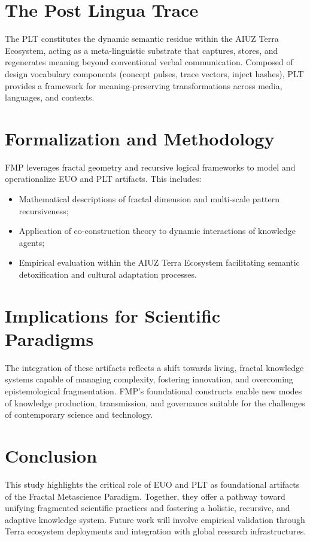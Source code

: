 \documentclass[12pt,a4paper]{article}
\begin{document}
\section{The Post Lingua Trace}
The PLT constitutes the dynamic semantic residue within the AIUZ Terra Ecosystem, acting as a meta-linguistic substrate that captures, stores, and regenerates meaning beyond conventional verbal communication. Composed of design vocabulary components (concept pulses, trace vectors, inject hashes), PLT provides a framework for meaning-preserving transformations across media, languages, and contexts.

\section{Formalization and Methodology}
FMP leverages fractal geometry and recursive logical frameworks to model and operationalize EUO and PLT artifacts. This includes:
\begin{itemize}
    \item Mathematical descriptions of fractal dimension and multi-scale pattern recursiveness;
    \item Application of co-construction theory to dynamic interactions of knowledge agents;
    \item Empirical evaluation within the AIUZ Terra Ecosystem facilitating semantic detoxification and cultural adaptation processes.
\end{itemize}

\section{Implications for Scientific Paradigms}
The integration of these artifacts reflects a shift towards living, fractal knowledge systems capable of managing complexity, fostering innovation, and overcoming epistemological fragmentation. FMP’s foundational constructs enable new modes of knowledge production, transmission, and governance suitable for the challenges of contemporary science and technology.

\section{Conclusion}
This study highlights the critical role of EUO and PLT as foundational artifacts of the Fractal Metascience Paradigm. Together, they offer a pathway toward unifying fragmented scientific practices and fostering a holistic, recursive, and adaptive knowledge system. Future work will involve empirical validation through Terra ecosystem deployments and integration with global research infrastructures.
\end{document}
